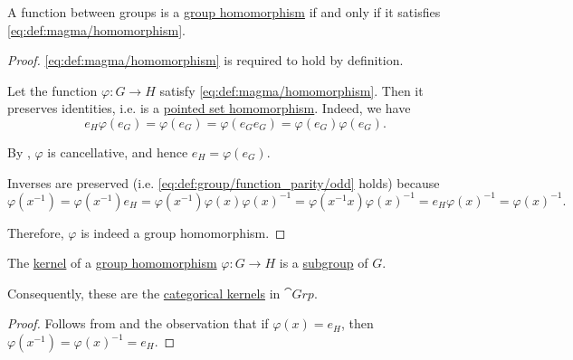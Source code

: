 \begin{proposition}\label{thm:group_homomorphism_single_condition}
  A function between groups is a \hyperref[def:group/homomorphism]{group homomorphism} if and only if it satisfies \eqref{eq:def:magma/homomorphism}.
\end{proposition}
\begin{proof}
  \SufficiencySubProof \eqref{eq:def:magma/homomorphism} is required to hold by definition.

  \NecessitySubProof Let the function \( \varphi: G \to H \) satisfy \eqref{eq:def:magma/homomorphism}. Then it preserves identities, i.e. is a \hyperref[def:pointed_set/homomorphism]{pointed set homomorphism}. Indeed, we have
  \begin{equation*}
    e_H \varphi(e_G) = \varphi(e_G) = \varphi(e_G e_G) = \varphi(e_G) \varphi(e_G).
  \end{equation*}

  By , \( \varphi \) is cancellative, and hence \( e_H = \varphi(e_G) \).

  Inverses are preserved (i.e. \eqref{eq:def:group/function_parity/odd} holds) because
  \begin{equation*}
    \varphi(x^{-1})
    =
    \varphi(x^{-1}) e_H
    =
    \varphi(x^{-1}) \varphi(x) \varphi(x)^{-1}
    =
    \varphi(x^{-1} x) \varphi(x)^{-1}
    =
    e_H \varphi(x)^{-1}
    =
    \varphi(x)^{-1}.
  \end{equation*}

  Therefore, \( \varphi \) is indeed a group homomorphism.
\end{proof}

\begin{proposition}\label{thm:group_kernels}
  The \hyperref[def:pointed_set_kernel]{kernel} of a \hyperref[def:group/homomorphism]{group homomorphism} \( \varphi: G \to H \) is a \hyperref[def:group/submodel]{subgroup} of \( G \).

  Consequently, these are the \hyperref[def:zero_morphisms/kernel]{categorical kernels} in \hyperref[def:monoid/category]{\( \cat{Grp} \)}.
\end{proposition}
\begin{proof}
  Follows from  and the observation that if \( \varphi(x) = e_H \), then \( \varphi(x^{-1}) = \varphi(x)^{-1} = e_H \).
\end{proof}

